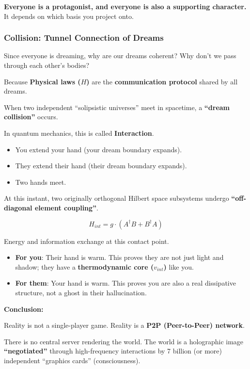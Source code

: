 \textbf{Everyone is a protagonist, and everyone is also a supporting character.} It depends on which basis you project onto.

\subsubsection{Collision: Tunnel Connection of Dreams}

Since everyone is dreaming, why are our dreams coherent? Why don't we pass through each other's bodies?

Because \textbf{Physical laws ($H$)} are the \textbf{communication protocol} shared by all dreams.

When two independent ``solipsistic universes'' meet in spacetime, a \textbf{``dream collision''} occurs.

In quantum mechanics, this is called \textbf{Interaction}.

\begin{itemize}
\item You extend your hand (your dream boundary expands).

\item They extend their hand (their dream boundary expands).

\item Two hands meet.
\end{itemize}

At this instant, two originally orthogonal Hilbert space subsystems undergo \textbf{``off-diagonal element coupling''}.

\[H_{int} = g \cdot (A^\dagger B + B^\dagger A)\]

Energy and information exchange at this contact point.

\begin{itemize}
\item \textbf{For you}: Their hand is warm. This proves they are not just light and shadow; they have a \textbf{thermodynamic core ($v_{int}$)} like you.

\item \textbf{For them}: Your hand is warm. This proves you are also a real dissipative structure, not a ghost in their hallucination.
\end{itemize}

\textbf{Conclusion:}

Reality is not a single-player game. Reality is a \textbf{P2P (Peer-to-Peer) network}.

There is no central server rendering the world. The world is a holographic image \textbf{``negotiated''} through high-frequency interactions by 7 billion (or more) independent ``graphics cards'' (consciousness).

